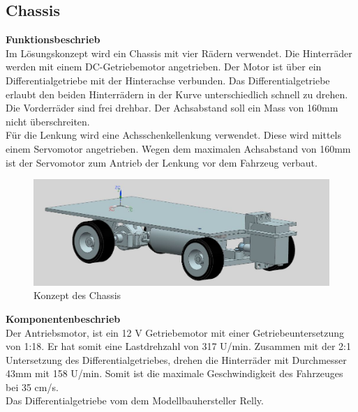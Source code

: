 \subsection{Chassis}

\textbf{Funktionsbeschrieb}
\\[0.2cm]
Im Lösungskonzept wird ein Chassis mit vier Rädern verwendet. Die Hinterräder werden mit einem DC-Getriebemotor angetrieben. Der Motor ist über ein Differentialgetriebe mit der Hinterachse verbunden. Das Differentialgetriebe erlaubt den beiden Hinterrädern in der Kurve unterschiedlich schnell zu drehen. Die Vorderräder sind frei drehbar. Der Achsabstand soll ein Mass von 160mm nicht überschreiten.\\
Für die Lenkung wird eine Achsschenkellenkung verwendet. Diese wird mittels einem Servomotor angetrieben. Wegen dem maximalen Achsabstand von 160mm ist der Servomotor zum Antrieb der Lenkung vor dem Fahrzeug verbaut.
\begin{figure}[H]%
\centering
\includegraphics[width=1\textwidth]{03_Loesungskonzept/pictures/Chassis_2.JPG}
\caption{Konzept des Chassis}
\label{fig:activityRoute}
\end{figure}\flushleft
\textbf{Komponentenbeschrieb}
\\[0.2cm]
Der Antriebsmotor, ist ein 12 V Getriebemotor mit einer Getriebeuntersetzung von 1:18. Er hat somit eine Lastdrehzahl von 317 U/min. Zusammen mit der 2:1 Untersetzung des Differentialgetriebes, drehen die Hinterräder mit Durchmesser 43mm mit 158 U/min. Somit ist die maximale Geschwindigkeit des Fahrzeuges bei 35 cm/s.\\
Das Differentialgetriebe vom dem Modellbauhersteller Relly.
